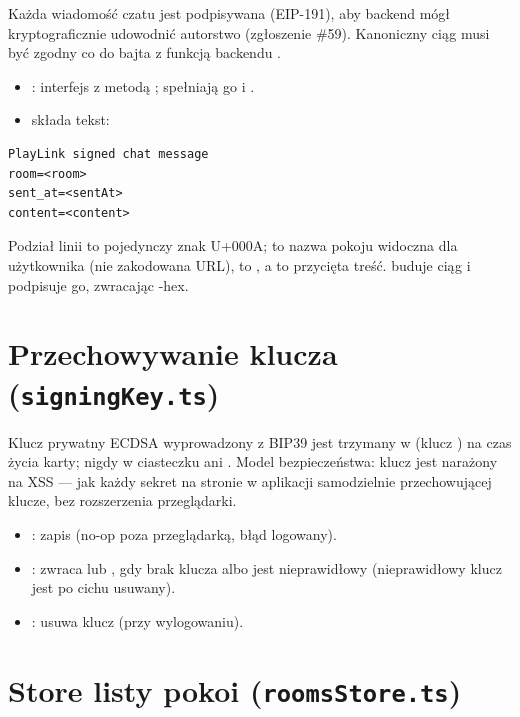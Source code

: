 Każda wiadomość czatu jest podpisywana (EIP-191), aby backend mógł kryptograficznie udowodnić
autorstwo (zgłoszenie \#59). Kanoniczny ciąg musi być zgodny co do bajta z funkcją backendu
.

\begin{itemize}[nosep]
  \item {}: interfejs z metodą ; spełniają go
         i .
  \item {} składa tekst:
\end{itemize}

\begin{lstlisting}
PlayLink signed chat message
room=<room>
sent_at=<sentAt>
content=<content>
\end{lstlisting}

Podział linii to pojedynczy znak U+000A;  to nazwa pokoju widoczna dla użytkownika
(nie zakodowana URL),  to , a  to
przycięta treść.  buduje ciąg i podpisuje go,
zwracając -hex.

\section{Przechowywanie klucza (\texttt{signingKey.ts})}\label{sec:fe-signingkey}

Klucz prywatny ECDSA wyprowadzony z BIP39 jest trzymany w  (klucz
) na czas życia karty; nigdy w ciasteczku ani . Model
bezpieczeństwa: klucz jest narażony na XSS --- jak każdy sekret na stronie w aplikacji
samodzielnie przechowującej klucze, bez rozszerzenia przeglądarki.

\begin{itemize}[nosep]
  \item {}: zapis (no-op poza przeglądarką, błąd logowany).
  \item {}: zwraca  lub , gdy brak klucza
        albo jest nieprawidłowy (nieprawidłowy klucz jest po cichu usuwany).
  \item {}: usuwa klucz (przy wylogowaniu).
\end{itemize}

\section{Store listy pokoi (\texttt{roomsStore.ts})}\label{sec:fe-roomsstore}

